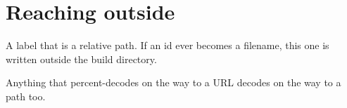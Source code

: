\section{Reaching outside}\label{hx-0200}



\begin{lemma}\label{../../escape}
A label that is a relative path. If an id ever becomes a filename, this one is written outside the build directory.
\end{lemma}

\begin{lemma}\label{hx/0004\%2e\%2e}
Anything that percent-decodes on the way to a URL decodes on the way to a path too.
\end{lemma}
